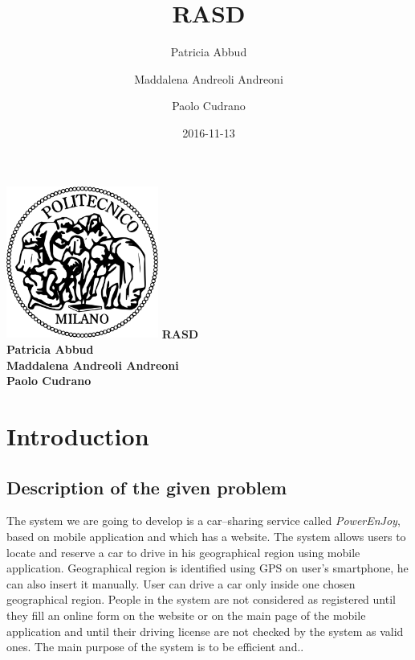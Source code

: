 \documentclass{article}
\title{RASD}
\date{2016-11-13}
\author{
	Patricia Abbud
	\and
	Maddalena Andreoli Andreoni
	\and
	Paolo Cudrano
}
\begin{document}
	\begin{titlepage}
		\centering
		\includegraphics[width=5cm]{img/polimi_logo.png} %
		\vfill
		{\bfseries\Large
			RASD\\
			\vskip4cm
			Patricia Abbud\\
			Maddalena Andreoli Andreoni\\
			Paolo Cudrano\\
		}
		\vfill
		\vfill
	\end{titlepage}

	\tableofcontents
	\newpage

	\section{Introduction}
		\subsection{Description of the given problem}
			The system we are going to develop is a car–sharing service called \textit{PowerEnJoy}, based on mobile application and which has a website. The system allows users to locate and reserve a car to drive in his geographical region using mobile application. Geographical region is identified using GPS on user's smartphone, he can also insert it manually. User can drive a car only inside one chosen geographical region. 
			People in the system are not considered as registered until they fill an online form on the website or on the main page of the mobile application and until their driving license are not checked by the system as valid ones.
			The main purpose of the system is to be efficient and.. %
\end{document}

